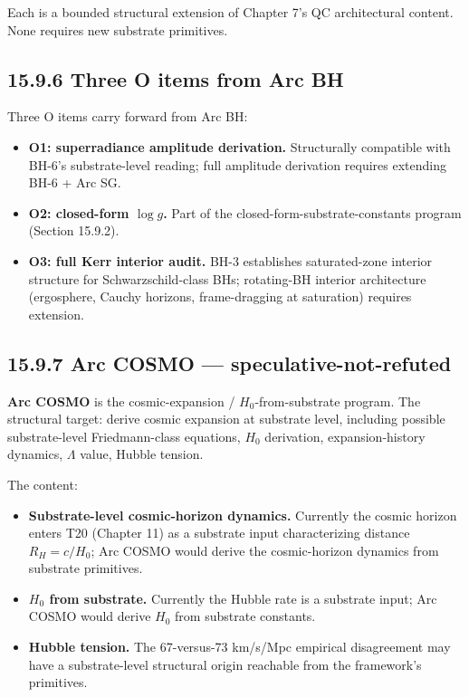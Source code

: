 \documentclass[11pt]{book}
\begin{document}
Each is a bounded structural extension of Chapter 7's QC architectural content. None requires new substrate primitives.

\subsection{15.9.6 Three O items from Arc BH}

Three O items carry forward from Arc BH:

\begin{itemize}
\item \textbf{O1: superradiance amplitude derivation.} Structurally compatible with BH-6's substrate-level reading; full amplitude derivation requires extending BH-6 + Arc SG.
\item \textbf{O2: closed-form $\log g$.} Part of the closed-form-substrate-constants program (Section 15.9.2).
\item \textbf{O3: full Kerr interior audit.} BH-3 establishes saturated-zone interior structure for Schwarzschild-class BHs; rotating-BH interior architecture (ergosphere, Cauchy horizons, frame-dragging at saturation) requires extension.
\end{itemize}

\subsection{15.9.7 Arc COSMO — speculative-not-refuted}

\textbf{Arc COSMO} is the cosmic-expansion / $H_0$-from-substrate program. The structural target: derive cosmic expansion at substrate level, including possible substrate-level Friedmann-class equations, $H_0$ derivation, expansion-history dynamics, $\Lambda$ value, Hubble tension.

The content:
\begin{itemize}
\item \textbf{Substrate-level cosmic-horizon dynamics.} Currently the cosmic horizon enters T20 (Chapter 11) as a substrate input characterizing distance $R_H = c/H_0$; Arc COSMO would derive the cosmic-horizon dynamics from substrate primitives.
\item \textbf{$H_0$ from substrate.} Currently the Hubble rate is a substrate input; Arc COSMO would derive $H_0$ from substrate constants.
\item \textbf{Hubble tension.} The 67-versus-73 km/s/Mpc empirical disagreement may have a substrate-level structural origin reachable from the framework's primitives.
\end{itemize}
\end{document}
